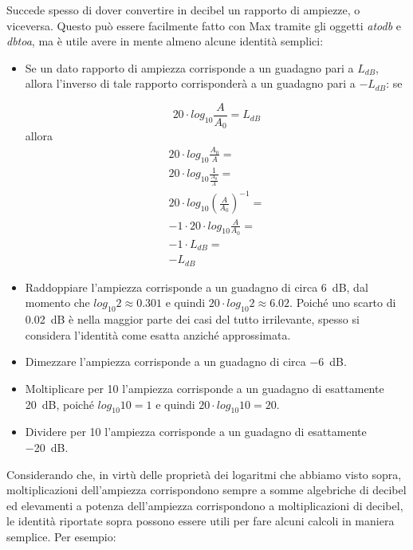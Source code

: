 Succede spesso di dover convertire in decibel un rapporto di ampiezze, o viceversa. Questo può essere facilmente fatto con Max tramite gli oggetti \emph{atodb} e \emph{dbtoa}, ma è utile avere in mente almeno alcune identità semplici:

\begin{itemize}

\item Se un dato rapporto di ampiezza corrisponde a un guadagno pari a $L_{dB}$, allora l'inverso di tale rapporto corrisponderà a un guadagno pari a $-L_{dB}$: se

\begin{equation}
20 \cdot log_{10} \frac{A}{A_0} = L_{dB}
\end{equation}
allora
\begin{equation}
\begin{aligned}
20 \cdot log_{10} \frac{A_0}{A} =\\
20 \cdot log_{10} \frac{1}{\frac{A_0}{A}} =\\
20 \cdot log_{10} (\frac{A}{A_0})^{-1} =\\
-1 \cdot 20 \cdot log_{10} \frac{A}{A_0} =\\
-1 \cdot L_{dB} =\\
-L_{dB}
\end{aligned}
\end{equation}

\item Raddoppiare l'ampiezza corrisponde a un guadagno di circa \qty{6}{dB}, dal momento che $log_{10} 2 \approx 0.301$ e quindi $20 \cdot log_{10} 2 \approx 6.02$. Poiché uno scarto di \qty{0.02}{dB} è nella maggior parte dei casi del tutto irrilevante, spesso si considera l'identità come esatta anziché approssimata.

\item Dimezzare l'ampiezza corrisponde a un guadagno di circa \qty{-6}{dB}.

\item Moltiplicare per 10 l'ampiezza corrisponde a un guadagno di esattamente \qty{20}{dB}, poiché $log_{10} 10 = 1$ e quindi $20 \cdot log_{10} 10 = 20$.

\item Dividere per 10 l'ampiezza corrisponde a un guadagno di esattamente \qty{-20}{dB}.

\end{itemize}

Considerando che, in virtù delle proprietà dei logaritmi che abbiamo visto sopra, moltiplicazioni dell'ampiezza corrispondono sempre a somme algebriche di decibel ed elevamenti a potenza dell'ampiezza corrispondono a moltiplicazioni di decibel, le identità riportate sopra possono essere utili per fare alcuni calcoli in maniera semplice. Per esempio:

